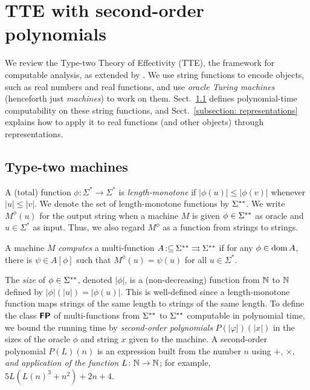 \documentclass[envcountsect,envcountsame,orivec,oribibl]{llncs}
\newcommand{\pcolon}{\mathpunct{\,:\subseteq}}
\begin{document}
\section{TTE with second-order polynomials}
\label{section: computable analysis}

We review the Type-two Theory of Effectivity (TTE), 
the framework for computable analysis, 
as extended by 
\cite{kawamura2012complexity}. 
We use string functions to 
encode objects, such as real numbers and real functions, 
and use \emph{oracle Turing machines} (henceforth just \emph{machines}) 
to work on them.
Sect.~\ref{section:TTF} defines polynomial-time computability on 
these string functions, 
and Sect.~\ref{subsection: representations} explains how to 
apply it to real functions (and other objects) through representations. 

\subsection{Type-two machines}
\label{section:TTF}

A (total) function $\phi \colon \Sigma^* \to \Sigma^*$ is \emph{length-monotone}
if $|\phi(u)| \le |\phi(v)|$ whenever $|u| \le |v|$.
We denote the set of length-monotone functions by $\Sigma ^{**}$.
We write $M ^\phi (u)$ for the output string 
when a machine $M$ is given
$\phi \in \Sigma ^{**}$ as oracle and $u \in \Sigma ^*$ as input.
Thus, we also regard $M^\phi$ as a function from strings to strings.

\begin{definition}
 A machine $M$ \emph{computes} a multi-function $A \pcolon \LM \rightrightarrows \LM$ if for any
 $\phi \in \mathop{\rm dom} A$, there is $\psi \in A[\phi]$ such that $M^\phi(u) = \psi(u)$ for all $u \in \Sigma^*$.
\end{definition}

The \emph{size} of $\phi \in \Sigma ^{**}$, denoted $|\phi|$,
is a (non-decreasing) function from $\mathbb N$ to $\mathbb N$ defined by 
$|\phi|(|u|) = |\phi(u)|$.
This is well-defined since a length-monotone function maps 
strings of the same length to strings of the same length.
To define the class $\text{\bfseries \sffamily \upshape FP}$ of 
multi-functions from $\Sigma ^{**}$ to $\Sigma ^{**}$ 
computable in polynomial time, 
we bound the running time by \emph{second-order polynomials} 
$P (\lvert \varphi \rvert) (\lvert x \rvert)$ 
in the sizes of the oracle $\phi$ and string $x$
given to the machine. 
A second-order polynomial $P (L) (n)$ 
is an expression built from the number $n$ 
using $\mathord+$, $\mathord\times$, 
\emph{and application of the function $L \colon \mathbb N \to \mathbb N$}; 
for example, 
$5 L (L (n) ^3 + n^2) + 2 n + 4$. 
\end{document}
